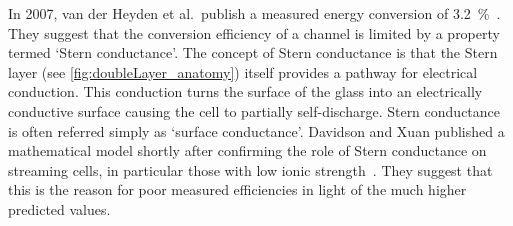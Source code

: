     In 2007, van der Heyden et al.\ publish a measured energy conversion of \SI{3.2}{\percent}~\cite{Heyden2007}.
    They suggest that the conversion efficiency of a channel is limited by a property termed `Stern conductance'.
    The concept of Stern conductance is that the Stern layer (see \cref{fig:doubleLayer_anatomy}) itself provides a pathway for electrical conduction.
    This conduction turns the surface of the glass into an electrically conductive surface causing the cell to partially self-discharge.
    Stern conductance is often referred simply as `surface conductance'.
    Davidson and Xuan published a mathematical model shortly after confirming the role of Stern conductance on streaming cells, in particular those with low ionic strength~\cite{Davidson2008}.
    They suggest that this is the reason for poor measured efficiencies in light of the much higher predicted values.

